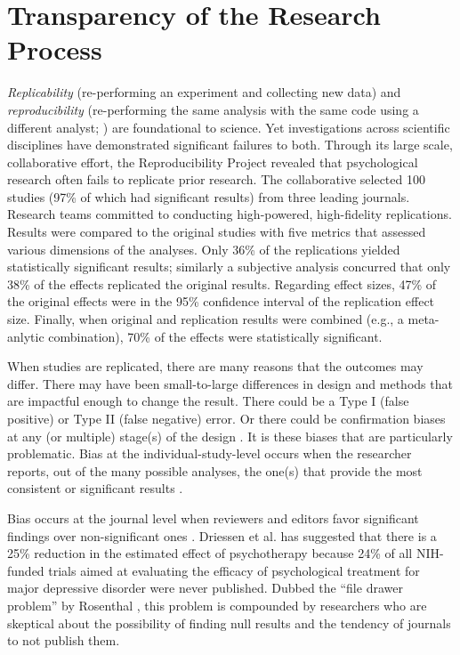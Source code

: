 \documentclass[
  11pt,
]{book}
\begin{document}
\hypertarget{transparency-of-the-research-process}{%
\section{Transparency of the Research Process}\label{transparency-of-the-research-process}}

\emph{Replicability} (re-performing an experiment and collecting new data) and \emph{reproducibility} (re-performing the same analysis with the same code using a different analyst; \citet{patil_statistical_2016}) are foundational to science. Yet investigations across scientific disciplines have demonstrated significant failures to both. Through its large scale, collaborative effort, the Reproducibility Project \citep{open_science_collaboration_estimating_2015} revealed that psychological research often fails to replicate prior research. The collaborative selected 100 studies (97\% of which had significant results) from three leading journals. Research teams committed to conducting high-powered, high-fidelity replications. Results were compared to the original studies with five metrics that assessed various dimensions of the analyses. Only 36\% of the replications yielded statistically significant results; similarly a subjective analysis concurred that only 38\% of the effects replicated the original results. Regarding effect sizes, 47\% of the original effects were in the 95\% confidence interval of the replication effect size. Finally, when original and replication results were combined (e.g., a meta-anlytic combination), 70\% of the effects were statistically significant.

When studies are replicated, there are many reasons that the outcomes may differ. There may have been small-to-large differences in design and methods that are impactful enough to change the result. There could be a Type I (false positive) or Type II (false negative) error. Or there could be confirmation biases at any (or multiple) stage(s) of the design \citep{stevens_replicability_2017}. It is these biases that are particularly problematic. Bias at the individual-study-level occurs when the researcher reports, out of the many possible analyses, the one(s) that provide the most consistent or significant results \citep{hengartner_raising_2018, vant_veer_pre-registration_2016}.

Bias occurs at the journal level when reviewers and editors favor significant findings over non-significant ones \citep{stevens_replicability_2017}. Driessen et al. \citeyearpar{driessen_does_2015} has suggested that there is a 25\% reduction in the estimated effect of psychotherapy because 24\% of all NIH-funded trials aimed at evaluating the efficacy of psychological treatment for major depressive disorder were never published. Dubbed the ``file drawer problem'' by Rosenthal \citeyearpar{rosenthal_file_1979}, this problem is compounded by researchers who are skeptical about the possibility of finding null results and the tendency of journals to not publish them.
\end{document}
